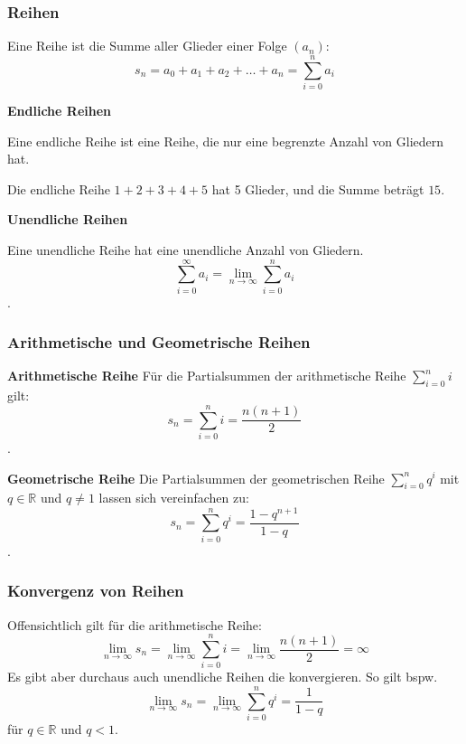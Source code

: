 \documentclass{beamer}
\begin{document}
  \begin{frame}
    \frametitle{Reihen}
    
    Eine Reihe ist die Summe aller Glieder einer Folge $(a_n)$:
    $$s_n = a_0 + a_1 + a_2 + \ldots + a_n = \sum_{i=0}^{n} a_i$$
  
    \vspace{0.5em}
  
    \textbf{Endliche Reihen}
  
    Eine endliche Reihe ist eine Reihe, die nur eine begrenzte Anzahl von Gliedern hat. 
  
    Die endliche Reihe $1 + 2 + 3 + 4 + 5$ hat 5 Glieder, und die Summe beträgt $15$.
  
    \vspace{0.5em}
  
    \textbf{Unendliche Reihen}
  
    Eine unendliche Reihe hat eine unendliche Anzahl von Gliedern. 
    $$\sum_{i=0}^{\infty} a_i = \lim_{n \to \infty} \sum_{i=0}^{n} a_i$$.
\end{frame}

\begin{frame}
  \frametitle{Arithmetische und Geometrische Reihen}
    \textbf{Arithmetische Reihe}
    Für die Partialsummen der arithmetische Reihe $\sum_{i=0}^{n} i $ gilt:
    $$ s_n = \sum_{i=0}^{n} i = \frac{n(n+1)}{2}$$.

    \textbf{Geometrische Reihe}
    Die Partialsummen der geometrischen Reihe $\sum_{i=0}^{n} q^i $ mit $q \in\mathbb{R}$ und $q \neq 1$ lassen sich vereinfachen zu:
    $$ s_n = \sum_{i=0}^{n} q^i = \frac{1-q^{n+1}}{1 - q }$$.

\end{frame}

\begin{frame}
  \frametitle{Konvergenz von Reihen}
  Offensichtlich gilt für die arithmetische Reihe:
  $$ \lim_{n \to \infty} s_n = \lim_{n \to \infty}  \sum_{i=0}^{n} i = \lim_{n \to \infty}  \frac{n(n+1)}{2} =\infty$$
  Es gibt aber durchaus auch unendliche Reihen die konvergieren. So gilt bspw.
  $$\lim_{n \to \infty}  s_n =\lim_{n \to \infty}  \sum_{i=0}^{n} q^i = \frac{1}{1 - q }$$
  für $q \in \mathbb{R}$ und $q < 1$.
  \end{frame}
  
\end{document}
